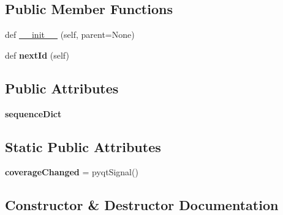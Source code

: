 \subsection*{Public Member Functions}
\begin{DoxyCompactItemize}
\item 
def \mbox{\hyperlink{class_dsg_tools_1_1_db_tools_1_1_batch_db_creator_1_1batch_db_creator_1_1_batch_db_creator_a778e30418f8f86771a42c1a371c0dac2}{\+\_\+\+\_\+init\+\_\+\+\_\+}} (self, parent=None)
\item 
\mbox{\label{class_dsg_tools_1_1_db_tools_1_1_batch_db_creator_1_1batch_db_creator_1_1_batch_db_creator_a4dc436656df7f358985c02459d1ed120}} 
def {\bfseries next\+Id} (self)
\end{DoxyCompactItemize}
\subsection*{Public Attributes}
\begin{DoxyCompactItemize}
\item 
\mbox{\label{class_dsg_tools_1_1_db_tools_1_1_batch_db_creator_1_1batch_db_creator_1_1_batch_db_creator_ada6ac436d9d0bdad265488f367315862}} 
{\bfseries sequence\+Dict}
\end{DoxyCompactItemize}
\subsection*{Static Public Attributes}
\begin{DoxyCompactItemize}
\item 
\mbox{\label{class_dsg_tools_1_1_db_tools_1_1_batch_db_creator_1_1batch_db_creator_1_1_batch_db_creator_a2e5a3fdc595a0eed7fbf93bdae2db181}} 
{\bfseries coverage\+Changed} = pyqt\+Signal()
\end{DoxyCompactItemize}


\subsection{Constructor \& Destructor Documentation}
\mbox{\label{class_dsg_tools_1_1_db_tools_1_1_batch_db_creator_1_1batch_db_creator_1_1_batch_db_creator_a778e30418f8f86771a42c1a371c0dac2}} 
